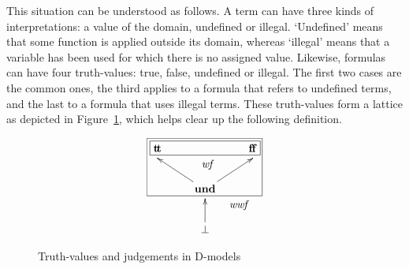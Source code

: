 \documentclass{article}
\newcommand{\D}{\textsf D}
\newcommand{\T}{\textsf T}
\newcommand{\wf}{\ \mbox{\em wf}}
\newcommand{\wwf}{\ \mbox{\em wwf}}
\newcommand{\myvdash}[1]{\ensuremath{\vdash^{\mathsf{#1}}}}
\begin{document}
This situation can be understood as follows.  A term can have three
kinds of interpretations: a value of the domain, undefined or illegal.
`Undefined' means that some function is applied outside its domain,
whereas `illegal' means that a variable has been used for which there
is no assigned value.  Likewise, formulas can have four truth-values: true,
false, undefined or illegal.  The first two cases are the common ones,
the third applies to a formula that refers to undefined terms, and the
last to a formula that uses illegal terms.  These truth-values form a
lattice as depicted in Figure~\ref{truth-values}, which helps clear up
the following definition.
\begin{figure}[ht]
\[
\xymatrix{\mathbf{t\!t} & & \mathbf{f\!f} \\
 & \mathbf{und}\ar[ul]+D-<0cm,1mm>\ar[ur]+D-<0cm,1mm> & \\
 & \bot\ar[u]+D-<0cm,1mm>
 \save"1,1"."1,3"*[F]\frm{}\restore
 \save{"1,1"+UL+<-1mm,1mm>}.{"2,3"+<3mm,-2mm>}*[F]\frm{}\restore
 \save"1,2"+<0mm,-5mm>*\txt{\wf}\restore
 \save"2,2"+<10mm,-5mm>*\txt{\wwf}\restore
}
\]
\caption{Truth-values and judgements in {\D}-models}\label{truth-values}
\end{figure}




\end{document}
